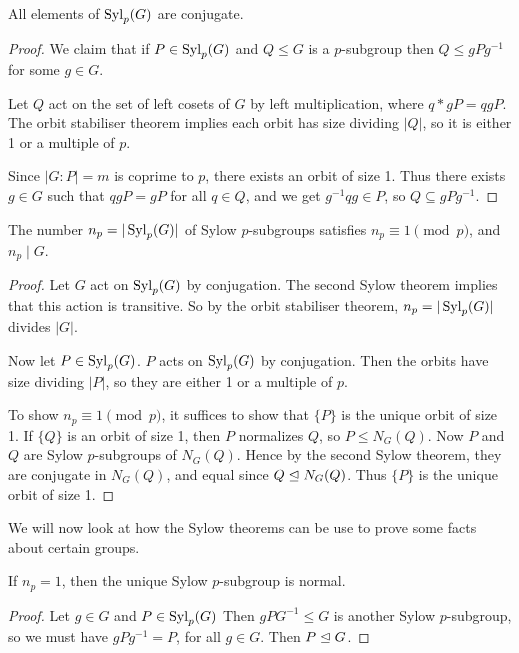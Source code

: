 \documentclass[a4paper]{scrreprt}
\begin{document}
\begin{theorem}
	All elements of $\operatorname{Syl}_p(G)$ are conjugate.
\end{theorem}
\begin{proof}
	We claim that if $P \in \operatorname{Syl}_p(G)$ and $Q \leq G$ is a $p$-subgroup then $Q \leq gPg^{-1}$ for some $g \in G$.
	
	Let $Q$ act on the set of left cosets of $G$ by left multiplication, where $q * gP = qgP$. The orbit stabiliser theorem implies each orbit has size dividing $|Q|$, so it is either 1 or a multiple of $p$. 

	Since $|G:P| = m$ is coprime to $p$, there exists an orbit of size 1. Thus there exists $g \in G$ such that $qgP = gP$ for all $q \in Q$, and we get $g^{-1}q g \in P$, so $Q \subseteq gPg^{-1}$.
\end{proof}

\begin{theorem}
	The number $n_p = |\operatorname{Syl}_p(G)|$ of Sylow $p$-subgroups satisfies $n_p \equiv 1 \pmod{p}$, and $n_p \mid G$. 
\end{theorem}
\begin{proof}
	Let $G$ act on $\operatorname{Syl}_p(G)$ by conjugation. The second Sylow theorem implies that this action is transitive. So by the orbit stabiliser theorem, $n_p = |\operatorname{Syl}_p(G)|$ divides $|G|$.

	Now let $P \in \operatorname{Syl}_p(G)$. $P$ acts on $\operatorname{Syl}_p(G)$ by conjugation. Then the orbits have size dividing $|P|$, so they are either 1 or a multiple of $p$.

	To show $n_p \equiv 1 \pmod{p}$, it suffices to show that $\{P\}$ is the unique orbit of size 1. If $\{Q\}$ is an orbit of size 1, then $P$ normalizes $Q$, so $P \leq N_G(Q)$. Now $P$ and $Q$ are Sylow $p$-subgroups of $N_G(Q)$. Hence by the second Sylow theorem, they are conjugate in $N_G(Q)$, and equal since $Q \trianglelefteq N_G(Q)$. Thus $\{P\}$ is the unique orbit of size 1.
\end{proof}



We will now look at how the Sylow theorems can be use to prove some facts about certain groups.

\begin{corollary}
	If $n_p = 1$, then the unique Sylow $p$-subgroup is normal.
\end{corollary}
\begin{proof}
Let $g \in G$ and $P \in \operatorname{Syl}_p(G)$ Then $gPG^{-1} \leq G$ is another Sylow $p$-subgroup, so we must have $gPg^{-1} = P$, for all $g \in G$. Then $P \trianglelefteq G$.
\end{proof}
\end{document}
